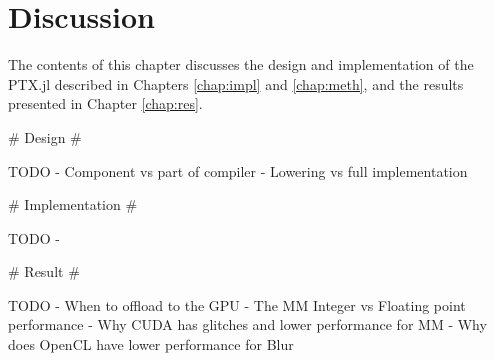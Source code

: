\chapter{Discussion}
\begin{markdown}

The contents of this chapter discusses the design and implementation
of the PTX.jl described in Chapters \ref{chap:impl} and
\ref{chap:meth}, and the results presented in Chapter \ref{chap:res}.

# Design #

TODO
- Component vs part of compiler
- Lowering vs full implementation

# Implementation #

TODO
- 

# Result #

TODO
- When to offload to the GPU
- The MM Integer vs Floating point performance
- Why CUDA has glitches and lower performance for MM
- Why does OpenCL have lower performance for Blur

\end{markdown}
